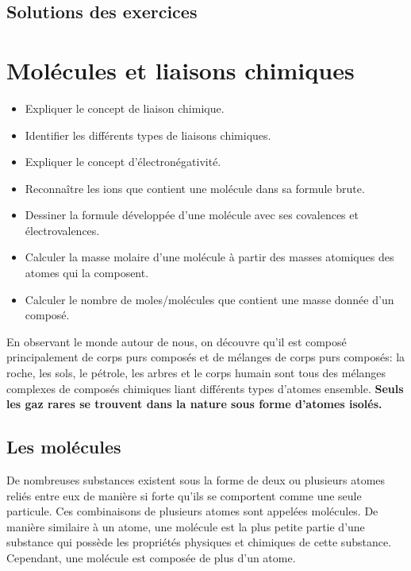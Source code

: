 \documentclass[
  11pt,
  a4paper,
  openany]{book}
\providecommand{\tightlist}{%
  \setlength{\itemsep}{0pt}\setlength{\parskip}{0pt}}
\begin{document}
\newpage

\section{Solutions des exercices} \shipoutAnswer

\chapter{Molécules et liaisons chimiques}\label{moluxe9cules-et-liaisons-chimiques}

\begin{objectives}

\begin{itemize}
\tightlist
\item
  Expliquer le concept de liaison chimique.
\item
  Identifier les différents types de liaisons chimiques.
\item
  Expliquer le concept d'électronégativité.
\item
  Reconnaître les ions que contient une molécule dans sa formule brute.
\item
  Dessiner la formule développée d'une molécule avec ses covalences et électrovalences.
\item
  Calculer la masse molaire d'une molécule à partir des masses atomiques des atomes qui la composent.
\item
  Calculer le nombre de moles/molécules que contient une masse donnée d'un composé.
\end{itemize}

\end{objectives}

En observant le monde autour de nous, on découvre qu'il est composé principalement de corps purs composés et de mélanges de corps purs composés: la roche, les sols, le pétrole, les arbres et le corps humain sont tous des mélanges complexes de composés chimiques liant différents types d'atomes ensemble. \textbf{Seuls les gaz rares se trouvent dans la nature sous forme d'atomes isolés.}

\section{Les molécules}\label{les-moluxe9cules}

De nombreuses substances existent sous la forme de deux ou plusieurs atomes reliés entre eux de manière si forte qu'ils se comportent comme une seule particule. Ces combinaisons de plusieurs atomes sont appelées molécules. De manière similaire à un atome, une molécule est la plus petite partie d'une substance qui possède les propriétés physiques et chimiques de cette substance. Cependant, une molécule est composée de plus d'un atome.
\end{document}
